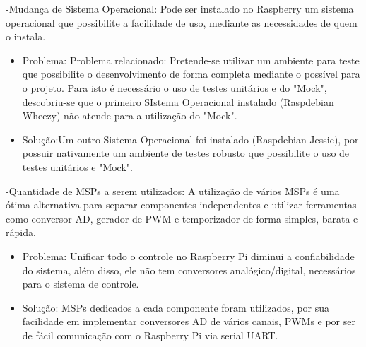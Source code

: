 -Mudança de Sistema Operacional: Pode ser instalado no Raspberry um sistema operacional que possibilite a facilidade de uso, mediante as necessidades de quem o instala.
 \begin{itemize}
      \item Problema:  Problema relacionado: Pretende-se utilizar um ambiente para teste que possibilite o desenvolvimento de forma completa mediante o possível para o projeto. Para isto é necessário o uso de testes unitários e do "Mock", descobriu-se que o primeiro SIstema Operacional instalado (Raspdebian Wheezy) não atende para a utilização do "Mock".

	  \item Solução:Um outro Sistema Operacional foi instalado (Raspdebian Jessie), por possuir nativamente um ambiente de testes robusto que possibilite o uso de testes unitários e "Mock".
    \end{itemize}

-Quantidade de MSPs a serem utilizados: A utilização de vários MSPs é uma ótima alternativa para separar componentes independentes e utilizar ferramentas como conversor AD, gerador de PWM e temporizador de forma simples, barata e rápida.
 \begin{itemize}
      \item Problema: Unificar todo o controle no Raspberry Pi diminui a confiabilidade do sistema, além disso, ele não tem conversores analógico/digital, necessários para o sistema de controle.

	  \item Solução: MSPs dedicados a cada componente foram utilizados, por sua facilidade em implementar conversores AD de vários canais, PWMs e por ser de fácil comunicação com o Raspberry Pi via serial UART.

    \end{itemize}

